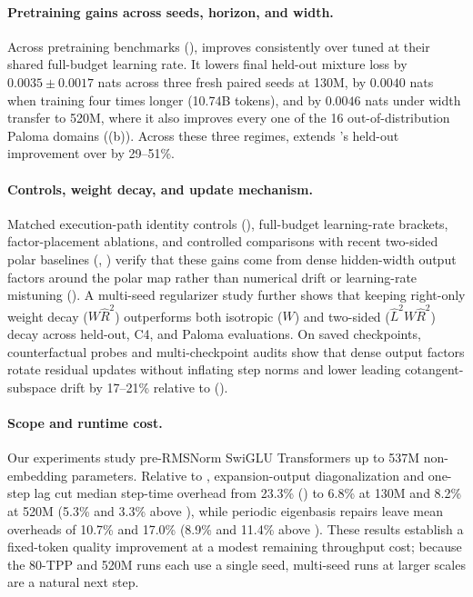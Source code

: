 \paragraph{Pretraining gains across seeds, horizon, and width.}
Across pretraining benchmarks (),  improves consistently over tuned  at their shared full-budget learning rate. It lowers final held-out mixture loss by $0.0035\pm0.0017$ nats across three fresh paired seeds at 130M, by $0.0040$ nats when training four times longer (10.74B tokens), and by $0.0046$ nats under width transfer to 520M, where it also improves every one of the 16 out-of-distribution Paloma domains ((b)). Across these three regimes,  extends 's held-out improvement over  by 29--51\%.

\paragraph{Controls, weight decay, and update mechanism.}
Matched execution-path identity controls (), full-budget learning-rate brackets, factor-placement ablations, and controlled comparisons with recent two-sided polar baselines (, ) verify that these gains come from dense hidden-width output factors around the polar map rather than numerical drift or learning-rate mistuning (). A multi-seed regularizer study further shows that keeping right-only weight decay ($W\hat R^2$) outperforms both isotropic ($W$) and two-sided ($\hat L^2 W\hat R^2$) decay across held-out, C4, and Paloma evaluations. On saved checkpoints, counterfactual probes and multi-checkpoint audits show that dense output factors rotate residual updates without inflating step norms and lower leading cotangent-subspace drift by 17--21\% relative to  ().

\paragraph{Scope and runtime cost.}
Our experiments study pre-RMSNorm SwiGLU Transformers up to 537M non-embedding parameters. Relative to , expansion-output diagonalization and one-step lag cut median step-time overhead from 23.3\% () to 6.8\% at 130M and 8.2\% at 520M (5.3\% and 3.3\% above ), while periodic eigenbasis repairs leave mean overheads of 10.7\% and 17.0\% (8.9\% and 11.4\% above ). These results establish a fixed-token quality improvement at a modest remaining throughput cost; because the 80-TPP and 520M runs each use a single seed, multi-seed runs at larger scales are a natural next step.
